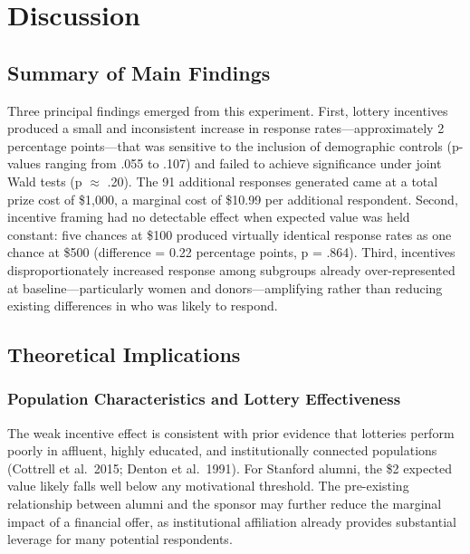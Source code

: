 \documentclass[12pt]{article}
\begin{document}

\section{Discussion}

\subsection{Summary of Main Findings}

Three principal findings emerged from this experiment. First, lottery incentives produced a small and inconsistent increase in response rates---approximately 2 percentage points---that was sensitive to the inclusion of demographic controls (p-values ranging from .055 to .107) and failed to achieve significance under joint Wald tests (p $\approx$ .20). The 91 additional responses generated came at a total prize cost of \$1,000, a marginal cost of \$10.99 per additional respondent. Second, incentive framing had no detectable effect when expected value was held constant: five chances at \$100 produced virtually identical response rates as one chance at \$500 (difference = 0.22 percentage points, p = .864). Third, incentives disproportionately increased response among subgroups already over-represented at baseline---particularly women and donors---amplifying rather than reducing existing differences in who was likely to respond.

\subsection{Theoretical Implications}

\subsubsection{Population Characteristics and Lottery Effectiveness}

The weak incentive effect is consistent with prior evidence that lotteries perform poorly in affluent, highly educated, and institutionally connected populations (Cottrell et al.\ 2015; Denton et al.\ 1991). For Stanford alumni, the \$2 expected value likely falls well below any motivational threshold. The pre-existing relationship between alumni and the sponsor may further reduce the marginal impact of a financial offer, as institutional affiliation already provides substantial leverage for many potential respondents.
\end{document}
